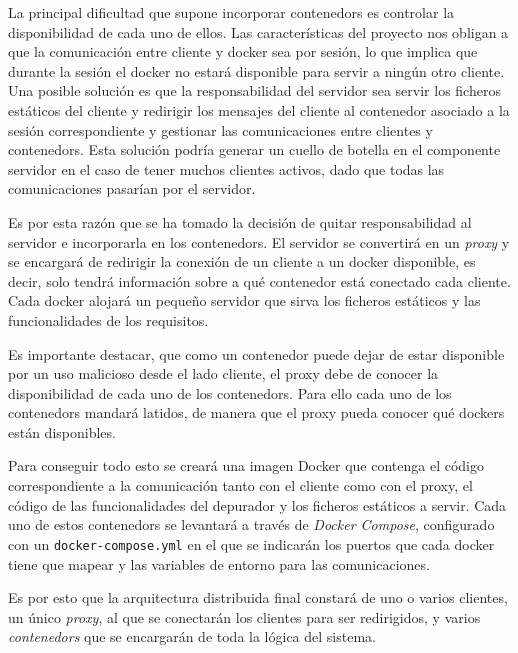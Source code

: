 La principal dificultad que supone incorporar \glspl{contenedor} es controlar la disponibilidad de cada uno de ellos. Las características del proyecto nos obligan a que la comunicación entre cliente y docker sea por sesión, lo que implica que durante la sesión el docker no estará disponible para servir a ningún otro cliente. Una posible solución es que la responsabilidad del servidor sea servir los ficheros estáticos del cliente y redirigir los mensajes del cliente al contenedor asociado a la sesión correspondiente y gestionar las comunicaciones entre clientes y \glspl{contenedor}. Esta solución podría generar un \gls{cuello de botella} en el componente servidor en el caso de tener muchos clientes activos, dado que todas las comunicaciones pasarían por el servidor.



Es por esta razón que se ha tomado la decisión de quitar responsabilidad al servidor e incorporarla en los \glspl{contenedor}. El servidor se convertirá en un \textit{\gls{proxy}} y se encargará de redirigir la conexión de un cliente a un docker disponible, es decir, solo tendrá información sobre a qué \gls{contenedor} está conectado cada cliente. 
Cada docker alojará un pequeño servidor que sirva los ficheros estáticos y las funcionalidades de los requisitos.


Es importante destacar, que como un \gls{contenedor} puede dejar de estar disponible por un uso malicioso desde el lado cliente, el \gls{proxy} debe de conocer la disponibilidad de cada uno de los \glspl{contenedor}. Para ello cada uno de los \glspl{contenedor} mandará latidos, de manera que el \gls{proxy} pueda conocer qué dockers están disponibles.

Para conseguir todo esto se creará una \gls{imagen Docker} que contenga el código correspondiente a la comunicación tanto con el cliente como con el \gls{proxy}, el código de las funcionalidades del depurador y los ficheros estáticos a servir. Cada uno de estos \glspl{contenedor} se levantará a través de \textit{Docker Compose}, configurado con un \texttt{docker-compose.yml} en el que se indicarán los puertos que cada docker tiene que mapear y las variables de entorno para las comunicaciones. 

Es por esto que la arquitectura distribuida final constará de uno o varios clientes, un único \textit{proxy}, al que se conectarán los clientes para ser redirigidos, y varios \textit{\glspl{contenedor}} que se encargarán de toda la lógica del sistema.

